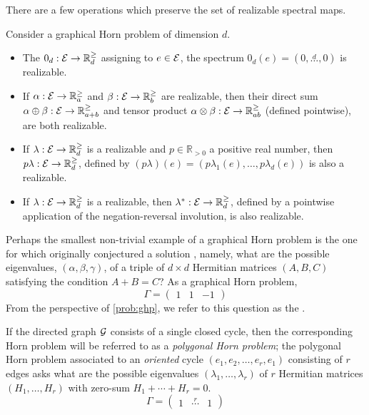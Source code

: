 \documentclass[notitlepage, 10pt]{article}
\begin{document}
There are a few operations which preserve the set of realizable spectral maps.
\begin{lem}
    Consider a graphical Horn problem of dimension $d$.
    \begin{itemize}
        \item The  $0_d : \mathcal E \to \mathbb R^{\geq}_{d}$ assigning to $e \in \mathcal E$, the spectrum $0_d(e) = (0, \stackrel{d}{\ldots}, 0)$ is realizable.
        \item If $\alpha : \mathcal E \to \mathbb R^{\geq}_{a}$ and $\beta : \mathcal E \to \mathbb R^{\geq}_{b}$ are realizable, then their direct sum $\alpha \oplus \beta : \mathcal E \to \mathbb R^{\geq}_{a+b}$ and tensor product $\alpha \otimes \beta : \mathcal E \to \mathbb R^{\geq}_{ab}$ (defined pointwise), are both realizable.
        \item If $\lambda : \mathcal E \to \mathbb R^{\geq}_{d}$ is a realizable and $p \in \mathbb R_{> 0}$ a positive real number, then $p \lambda : \mathcal E \to \mathbb R^{\geq}_{d}$, defined by $(p\lambda)(e) = (p\lambda_1(e), \ldots, p\lambda_d(e))$ is also a realizable.
        \item If $\lambda : \mathcal E \to \mathbb R^{\geq}_{d}$ is a realizable, then $\lambda^{*} : \mathcal E \to \mathbb R^{\geq}_{d}$, defined by a pointwise application of the negation-reversal involution, is also realizable.
    \end{itemize}
\end{lem}


\begin{exam}
    Perhaps the smallest non-trivial example of a graphical Horn problem is the one for which \citeauthor{horn1962eigenvalues} originally conjectured a solution \cite{horn1962eigenvalues}, namely, what are the possible eigenvalues, $(\alpha, \beta, \gamma)$, of a triple of $d\times d$ Hermitian matrices $(A, B, C)$ satisfying the condition $A+B=C$?
    As a graphical Horn problem,
    \begin{equation}
        \Gamma = \begin{pmatrix} 1 & 1 & - 1 \end{pmatrix}
    \end{equation}
    From the perspective of \cref{prob:ghp}, we refer to this question as the .
\end{exam}

\begin{exam}
    If the directed graph $\mathcal G$ consists of a single closed cycle, then the corresponding Horn problem will be referred to as a \textit{polygonal Horn problem}; the polygonal Horn problem associated to an \textit{oriented} cycle $(e_1, e_2, \ldots, e_{r}, e_{1})$ consisting of $r$ edges asks what are the possible eigenvalues $(\lambda_1, \ldots, \lambda_r)$ of $r$ Hermitian matrices $(H_1, \ldots, H_r)$ with zero-sum $H_1 +\cdots + H_r = 0$.
    \begin{equation}
        \Gamma = \begin{pmatrix} 1 & \stackrel{r}{\cdots} & 1 \end{pmatrix}
    \end{equation}

\end{exam}
\end{document}
